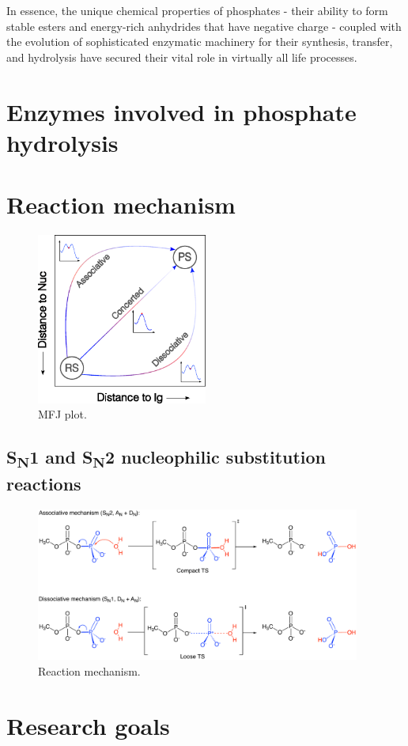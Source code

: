 In essence, the unique chemical properties of phosphates - their ability to form stable esters and energy-rich anhydrides that have negative charge - coupled with the evolution of sophisticated enzymatic machinery for their synthesis, transfer, and hydrolysis have secured their vital role in virtually all life processes.


\section{Enzymes involved in phosphate hydrolysis}



\section{Reaction mechanism}

\begin{figure}[htbp]
    \centering
    \includegraphics[width=0.5\textwidth]{Figures/1_Introduction/intro_mfj_plot.pdf}
    \caption{MFJ plot.}
    \label{fig:mfj_plot}
\end{figure}

\subsection{S\textsubscript{N}1 and S\textsubscript{N}2 nucleophilic substitution reactions}

\begin{figure}[htbp]
    \centering
    \includegraphics[width=0.95\textwidth]{Figures/1_Introduction/intro_reaction_mechanism.pdf}
    \caption{Reaction mechanism.}
    \label{fig:reaction-mechanism}
\end{figure}


\section{Research goals}


